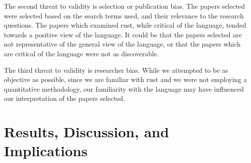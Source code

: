 \documentclass[conference]{IEEEtran}
\begin{document}
{
    The second threat to validity is selection or publication bias. The papers selected were selected based on the search terms used, and their relevance to the research questions. The papers which examined rust, while critical of the language, tended
    towards a positive view of the language. It could be that the papers selected are not representative of the general view of the language, or that the papers which are critical of the language were not as discoverable.
}

{
    The third threat to validity is researcher bias. While we attempted to be as objective as possible, since we are familiar with rust and we were not employing a quantitative methodology,
    our familiarity with the language may have influenced our interpretation of the papers selected.
}

\section{Results, Discussion, and Implications}
\label{results}
\end{document}
